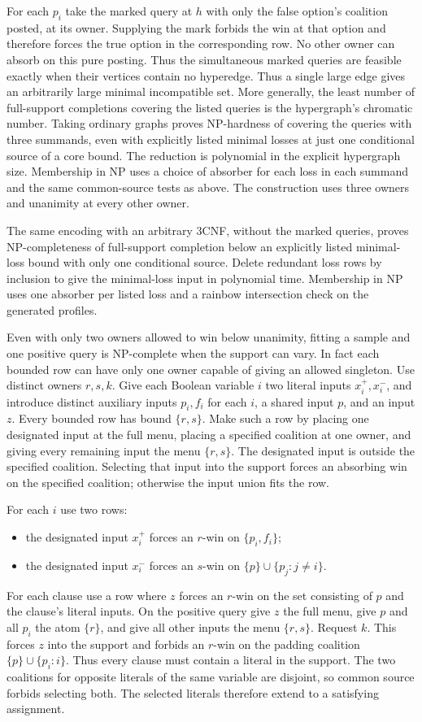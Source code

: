 For each $p_i$ take the marked query at $h$ with
only the false option's coalition posted, at its
owner. Supplying the mark forbids the win at that
option and therefore forces the true option in the
corresponding row. No other owner can absorb on
this pure posting. Thus the simultaneous marked
queries are feasible exactly when their vertices
contain no hyperedge. Thus a single large edge
gives an arbitrarily large minimal incompatible
set. More generally, the least number of
full-support completions covering the listed
queries is the hypergraph's chromatic number.
Taking ordinary graphs proves NP-hardness of
covering the queries with three summands, even
with explicitly listed minimal losses at just
one conditional source of a core bound. The
reduction is polynomial in the explicit hypergraph
size. Membership in NP uses a choice of absorber
for each loss in each summand and the same
common-source tests as above. The construction
uses three owners and unanimity at every other
owner.

The same encoding with an arbitrary 3CNF, without
the marked queries, proves NP-completeness of
full-support completion below an explicitly listed
minimal-loss bound with only one conditional source.
Delete redundant loss rows by inclusion to give the
minimal-loss input in polynomial time. Membership in
NP uses one absorber per listed loss and a rainbow
intersection check on the generated profiles.

Even with only two owners allowed to win below unanimity,
fitting a sample and one positive query is NP-complete when
the support can vary. In fact each bounded row can have only
one owner capable of giving an allowed singleton. Use distinct
owners $r,s,k$. Give each Boolean variable $i$ two literal
inputs $x_i^+,x_i^-$, and introduce distinct auxiliary inputs
$p_i,f_i$ for each $i$, a shared input $p$, and an input $z$.
Every bounded row has bound $\{r,s\}$. Make such a row by
placing one designated input at the full menu, placing a
specified coalition at one owner, and giving every remaining
input the menu $\{r,s\}$. The designated input is outside
the specified coalition. Selecting that input into the
support forces an absorbing win on the specified coalition;
otherwise the input union fits the row.

For each $i$ use two rows:
\begin{itemize}
\item the designated input $x_i^+$ forces an $r$-win on
$\{p_i,f_i\}$;
\item the designated input $x_i^-$ forces an $s$-win on
$\{p\}\cup\{p_j:j\ne i\}$.
\end{itemize}
For each clause use a row where $z$ forces an $r$-win on the
set consisting of $p$ and the clause's literal inputs.
On the positive query give $z$ the full menu, give $p$ and
all $p_i$ the atom $\{r\}$, and give all other inputs the
menu $\{r,s\}$. Request $k$. This forces $z$ into the
support and forbids an $r$-win on the padding coalition
$\{p\}\cup\{p_i:i\}$. Thus every clause must contain a
literal in the support. The two coalitions for opposite
literals of the same variable are disjoint, so common
source forbids selecting both. The selected literals
therefore extend to a satisfying assignment.

